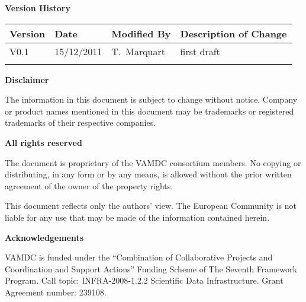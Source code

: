 {\begin{titlepage}
\end{titlepage}

\noindent \textbf{Version History}

\textbf{}

\noindent \begin{tabular}{|l|l|l|l|} 
\hline 
\textbf{Version} & \textbf{Date} & \textbf{Modified By} & \textbf{Description of Change} \\ \hline 
V0.1 & 15/12/2011 & T.~Marquart & first draft \\ \hline 
 &  &  &  \\ \hline 
\end{tabular}

\textbf{}

\noindent \textbf{Disclaimer}

\noindent The information in this document is subject to change without notice. Company or product names mentioned in this document may be trademarks or registered trademarks of their respective companies.


\textbf{}

\noindent \textbf{All rights reserved}

\noindent The document is proprietary of the VAMDC consortium members. No copying or distributing, in any form or by any means, is allowed without the prior written agreement of the owner of the property rights.

\noindent 

\noindent This document reflects only the authors' view. The European Community is not liable for any use that may be made of the information contained herein.

\textbf{}

\noindent \textbf{Acknowledgements}

\noindent VAMDC is funded under the ``Combination of Collaborative Projects and Coordination and  Support Actions'' Funding Scheme of The Seventh Framework Program. Call topic: INFRA-2008-1.2.2 Scientific Data Infrastructure. Grant Agreement number: 239108.

\textbf{}

}
